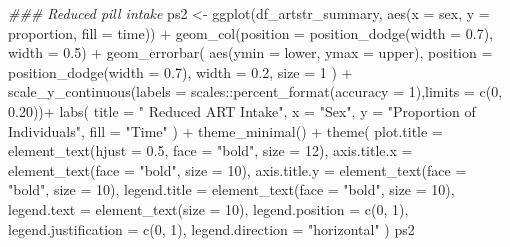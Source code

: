 \documentclass[
  letterpaper,
  DIV=11,
  numbers=noendperiod]{scrartcl}
\newenvironment{Shaded}{\begin{snugshade}}{\end{snugshade}}
\newcommand{\AttributeTok}[1]{\textcolor[rgb]{0.40,0.45,0.13}{#1}}
\newcommand{\DecValTok}[1]{\textcolor[rgb]{0.68,0.00,0.00}{#1}}
\newcommand{\DocumentationTok}[1]{\textcolor[rgb]{0.37,0.37,0.37}{\textit{#1}}}
\newcommand{\FloatTok}[1]{\textcolor[rgb]{0.68,0.00,0.00}{#1}}
\newcommand{\FunctionTok}[1]{\textcolor[rgb]{0.28,0.35,0.67}{#1}}
\newcommand{\NormalTok}[1]{\textcolor[rgb]{0.00,0.23,0.31}{#1}}
\newcommand{\OtherTok}[1]{\textcolor[rgb]{0.00,0.23,0.31}{#1}}
\newcommand{\SpecialCharTok}[1]{\textcolor[rgb]{0.37,0.37,0.37}{#1}}
\newcommand{\StringTok}[1]{\textcolor[rgb]{0.13,0.47,0.30}{#1}}
\begin{document}
\begin{Shaded}
\begin{Highlighting}[]
\DocumentationTok{\#\#\# Reduced pill intake}
\NormalTok{ps2 }\OtherTok{\textless{}{-}} \FunctionTok{ggplot}\NormalTok{(df\_artstr\_summary, }\FunctionTok{aes}\NormalTok{(}\AttributeTok{x =}\NormalTok{ sex, }\AttributeTok{y =}\NormalTok{ proportion, }\AttributeTok{fill =}\NormalTok{ time)) }\SpecialCharTok{+}
  \FunctionTok{geom\_col}\NormalTok{(}\AttributeTok{position =} \FunctionTok{position\_dodge}\NormalTok{(}\AttributeTok{width =} \FloatTok{0.7}\NormalTok{), }\AttributeTok{width =} \FloatTok{0.5}\NormalTok{) }\SpecialCharTok{+}
  \FunctionTok{geom\_errorbar}\NormalTok{(}
    \FunctionTok{aes}\NormalTok{(}\AttributeTok{ymin =}\NormalTok{ lower, }\AttributeTok{ymax =}\NormalTok{ upper),}
    \AttributeTok{position =} \FunctionTok{position\_dodge}\NormalTok{(}\AttributeTok{width =} \FloatTok{0.7}\NormalTok{),}
    \AttributeTok{width =} \FloatTok{0.2}\NormalTok{,}
    \AttributeTok{size =} \DecValTok{1}
\NormalTok{  ) }\SpecialCharTok{+}
  \FunctionTok{scale\_y\_continuous}\NormalTok{(}\AttributeTok{labels =}\NormalTok{ scales}\SpecialCharTok{::}\FunctionTok{percent\_format}\NormalTok{(}\AttributeTok{accuracy =} \DecValTok{1}\NormalTok{),}\AttributeTok{limits =} \FunctionTok{c}\NormalTok{(}\DecValTok{0}\NormalTok{, }\FloatTok{0.20}\NormalTok{))}\SpecialCharTok{+}
  \FunctionTok{labs}\NormalTok{(}
    \AttributeTok{title =} \StringTok{" Reduced ART Intake"}\NormalTok{,}
    \AttributeTok{x =} \StringTok{"Sex"}\NormalTok{,}
    \AttributeTok{y =} \StringTok{"Proportion of Individuals"}\NormalTok{,}
    \AttributeTok{fill =} \StringTok{"Time"}
\NormalTok{  ) }\SpecialCharTok{+}
  \FunctionTok{theme\_minimal}\NormalTok{() }\SpecialCharTok{+}
  \FunctionTok{theme}\NormalTok{(}
    \AttributeTok{plot.title =} \FunctionTok{element\_text}\NormalTok{(}\AttributeTok{hjust =} \FloatTok{0.5}\NormalTok{, }\AttributeTok{face =} \StringTok{"bold"}\NormalTok{, }\AttributeTok{size =} \DecValTok{12}\NormalTok{),}
    \AttributeTok{axis.title.x =} \FunctionTok{element\_text}\NormalTok{(}\AttributeTok{face =} \StringTok{"bold"}\NormalTok{, }\AttributeTok{size =} \DecValTok{10}\NormalTok{),}
    \AttributeTok{axis.title.y =} \FunctionTok{element\_text}\NormalTok{(}\AttributeTok{face =} \StringTok{"bold"}\NormalTok{, }\AttributeTok{size =} \DecValTok{10}\NormalTok{),}
    \AttributeTok{legend.title =} \FunctionTok{element\_text}\NormalTok{(}\AttributeTok{face =} \StringTok{"bold"}\NormalTok{, }\AttributeTok{size =} \DecValTok{10}\NormalTok{),}
    \AttributeTok{legend.text =} \FunctionTok{element\_text}\NormalTok{(}\AttributeTok{size =} \DecValTok{10}\NormalTok{),}
    \AttributeTok{legend.position =} \FunctionTok{c}\NormalTok{(}\DecValTok{0}\NormalTok{, }\DecValTok{1}\NormalTok{),}
   \AttributeTok{legend.justification =} \FunctionTok{c}\NormalTok{(}\DecValTok{0}\NormalTok{, }\DecValTok{1}\NormalTok{),}
    \AttributeTok{legend.direction =} \StringTok{"horizontal"}
\NormalTok{  )}
\NormalTok{ps2}
\end{Highlighting}
\end{Shaded}
\end{document}
